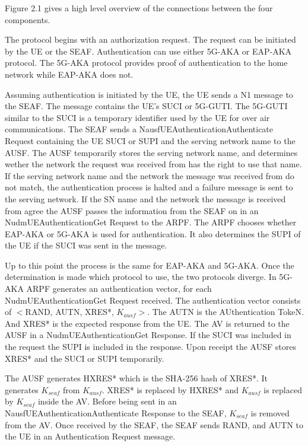 \documentclass[11pt, pdftex]{article}
\begin{document}
Figure 2.1 gives a high level overview of the connections between the four components.
\newline

The protocol begins with an authorization request.  The request can be initiated by the UE or the SEAF.  Authentication can use either 5G-AKA or EAP-AKA protocol.  The 5G-AKA protocol provides proof of authentication to the home network while EAP-AKA does not.  

Assuming authentication is initiated by the UE, the UE sends a N1 message to the SEAF.  The message contains the UE's SUCI or 5G-GUTI.  The 5G-GUTI similar to the SUCI is a temporary identifier used by the UE for over air communications.  The SEAF sends a Nausf\textunderscore UEAuthentication\textunderscore Authenticate Request containing the UE SUCI or SUPI and the serving network name to the AUSF.  The AUSF temporarily stores the serving network name, and determines wether the network the request was received from has the right to use that name.  If the serving network name and the network the message was received from do not match, the authentication process is halted and a failure message is sent to the serving network.  If the SN name and the network the message is received from agree the AUSF passes the information from the SEAF on in an Nudm\textunderscore UEAuthentication\textunderscore Get Request to the ARPF.  The ARPF chooses whether EAP-AKA or 5G-AKA is used for authentication.  It also determines the SUPI of the UE if the SUCI was sent in the message.  

Up to this point the process is the same for EAP-AKA and 5G-AKA.  Once the determination is made which protocol to use, the two protocols diverge.  In 5G-AKA ARPF generates an authentication vector, for each Nudm\textunderscore UEAuthentication\textunderscore Get Request received.  The authentication vector consists of $<$RAND, AUTN, XRES*, $K_{ausf}$$>$.  The AUTN is the AUthentication TokeN.  And XRES* is the expected response from the UE.  The AV is returned to the AUSF in a Nudm\textunderscore UEAuthentication\textunderscore Get Response.  If the SUCI was included in the request the SUPI is included in the response.  Upon receipt the AUSF stores XRES* and the SUCI or SUPI temporarily.  

The AUSF generates HXRES* which is the SHA-256 hash of XRES*.  It generates $K_{seaf}$ from $K_{ausf}$.  XRES* is replaced by HXRES* and $K_{ausf}$ is replaced by $K_{seaf}$ inside the AV.  Before being sent in an Nausf\textunderscore UEAuthentication\textunderscore Authenticate Response to the SEAF, $K_{seaf}$ is removed from the AV.  Once received by the SEAF, the SEAF sends RAND, and AUTN to the UE in an Authentication Request message.  
\end{document}
